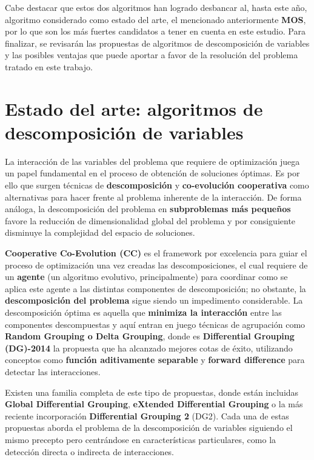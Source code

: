 Cabe destacar que estos dos algoritmos han logrado desbancar al, hasta este año, algoritmo considerado como estado del arte, el mencionado anteriormente \textbf{MOS}, por lo que son los más fuertes candidatos a tener en cuenta en este estudio. Para finalizar, se revisarán las propuestas de algoritmos de descomposición de variables y las posibles ventajas que puede aportar a favor de la resolución del problema tratado en este trabajo.

\section{Estado del arte: algoritmos de descomposición de variables}

La interacción de las variables del problema que requiere de optimización juega un papel fundamental en el proceso de obtención de soluciones óptimas. Es por ello que surgen técnicas de \textbf{descomposición} y \textbf{co-evolución cooperativa} como alternativas para hacer frente al problema inherente de la interacción. De forma análoga, la descomposición del problema en \textbf{subproblemas más pequeños} favore la reducción de dimensionalidad global del problema y por consiguiente disminuye la complejidad del espacio de soluciones.

\textbf{Cooperative Co-Evolution (CC)}\cite{ELSGOI} es el framework por excelencia para guiar el proceso de optimización una vez creadas las descomposiciones, el cual requiere de un \textbf{agente} (un algoritmo evolutivo, principalmente) para coordinar como se aplica este agente a las distintas componentes de descomposición; no obstante, la \textbf{descomposición del problema} sigue siendo un impedimento considerable. La descomposición óptima es aquella que \textbf{minimiza la interacción} entre las componentes descompuestas y aquí entran en juego técnicas de agrupación como \textbf{Random Grouping o Delta Grouping}, donde es \textbf{Differential Grouping (DG)-2014} \cite{DG} la propuesta que ha alcanzado mejores cotas de éxito, utilizando conceptos como \textbf{función aditivamente separable} y \textbf{forward difference} para detectar las interacciones.

Existen una familia completa de este tipo de propuestas, donde están incluidas  \textbf{Global Differential Grouping}\cite{GDG}, \textbf{eXtended Differential Grouping}\cite{XDG} o la más reciente incorporación \textbf{Differential Grouping 2} (DG2)\cite{DG2}. Cada una de estas propuestas aborda el problema de la descomposición de variables siguiendo el mismo precepto pero centrándose en características particulares, como la detección directa o indirecta de interacciones. 

